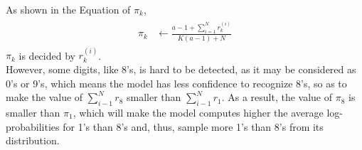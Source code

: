 \documentclass{myhw}
\begin{document}
\begin{homeworkProblem}
\begin{homeworkSection}
As shown in the Equation of $\pi_k$, 
\begin{gather*}
\begin{aligned}
\pi_k & \leftarrow \frac{a-1+\sum_{i=1}^{N} r_k^{(i)}}{K(a-1)+N}
\end{aligned}
\end{gather*}
$\pi_k$ is decided by $r_k^{(i)}$. \\
However, some digits, like 8's, is hard to be detected, as it may be considered as 0's or 9's, which means the model has less confidence to recognize 8's, so as to make the value of $\sum_{i-1}^N r_8$ smaller than $\sum_{i-1}^N  r_1$. As a result, the value of $\pi_8$ is smaller than $\pi_1$, which will make the model computes higher the average log-probabilities for 1's than 8's and, thus, sample more 1's than 8's from its distribution.
\end{homeworkSection}
\end{homeworkProblem}
\end{document}
